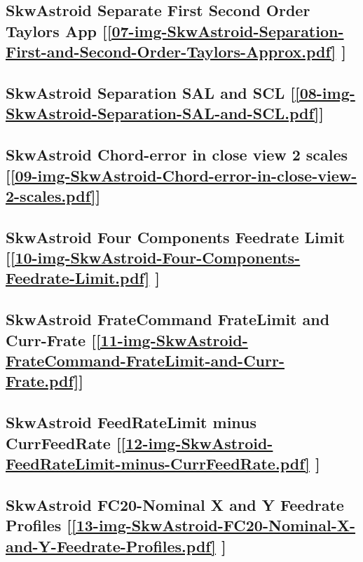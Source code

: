 \subsection       {SkwAstroid Separate First Second Order Taylors App
	[\ref      {07-img-SkwAstroid-Separation-First-and-Second-Order-Taylors-Approx.pdf} ] }
\label{ssec-07-img-SkwAstroid-Separation-First-and-Second-Order-Taylors-Approx.pdf}

\subsection       {SkwAstroid Separation SAL and SCL
	[\ref      {08-img-SkwAstroid-Separation-SAL-and-SCL.pdf}] }
\label{ssec-08-img-SkwAstroid-Separation-SAL-and-SCL.pdf}

\subsection       {SkwAstroid Chord-error in close view 2 scales
	[\ref      {09-img-SkwAstroid-Chord-error-in-close-view-2-scales.pdf}] }
\label{ssec-09-img-SkwAstroid-Chord-error-in-close-view-2-scales.pdf}

\subsection       {SkwAstroid Four Components Feedrate Limit
	[\ref      {10-img-SkwAstroid-Four-Components-Feedrate-Limit.pdf} ] }
\label{ssec-10-img-SkwAstroid-Four-Components-Feedrate-Limit.pdf}

\subsection    {SkwAstroid FrateCommand FrateLimit and Curr-Frate
	[\ref      {11-img-SkwAstroid-FrateCommand-FrateLimit-and-Curr-Frate.pdf}] }
\label{ssec-11-img-SkwAstroid-FrateCommand-FrateLimit-and-Curr-Frate.pdf}

\subsection     {SkwAstroid FeedRateLimit minus CurrFeedRate
	[\ref      {12-img-SkwAstroid-FeedRateLimit-minus-CurrFeedRate.pdf} ] }
\label{ssec-12-img-SkwAstroid-FeedRateLimit-minus-CurrFeedRate.pdf}

\subsection     {SkwAstroid FC20-Nominal X and Y Feedrate Profiles
	[\ref      {13-img-SkwAstroid-FC20-Nominal-X-and-Y-Feedrate-Profiles.pdf} ] }
\label{ssec-13-img-SkwAstroid-FC20-Nominal-X-and-Y-Feedrate-Profiles.pdf}

